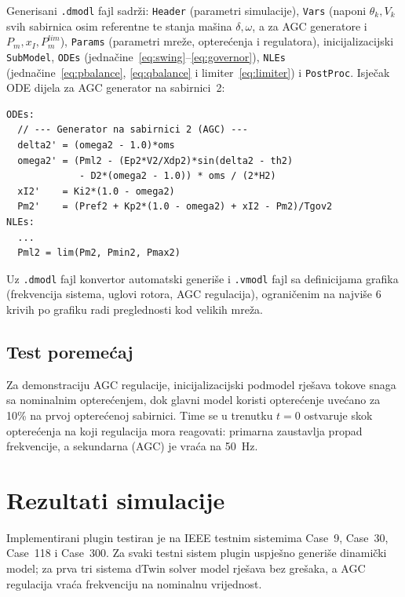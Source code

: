 \documentclass[12pt,oneside, a4paper]{book}
\begin{document}
Generisani \texttt{.dmodl} fajl sadrži: \texttt{Header} (parametri
simulacije), \texttt{Vars} (naponi $\theta_k, V_k$ svih sabirnica osim
referentne te stanja mašina $\delta, \omega$, a za AGC generatore i $P_m,
x_I, P_m^{lim}$), \texttt{Params} (parametri mreže, opterećenja i
regulatora), inicijalizacijski \texttt{SubModel}, \texttt{ODEs}
(jednačine~\ref{eq:swing}--\ref{eq:governor}), \texttt{NLEs}
(jednačine~\ref{eq:pbalance}, \ref{eq:qbalance} i limiter~\ref{eq:limiter})
i \texttt{PostProc}. Isječak ODE dijela za AGC generator na sabirnici~2:
 
\begin{lstlisting}[caption={Isječak generisanog .dmodl fajla -- AGC generator na sabirnici 2}, style=cppstyle]
ODEs:
  // --- Generator na sabirnici 2 (AGC) ---
  delta2' = (omega2 - 1.0)*oms
  omega2' = (Pml2 - (Ep2*V2/Xdp2)*sin(delta2 - th2)
             - D2*(omega2 - 1.0)) * oms / (2*H2)
  xI2'    = Ki2*(1.0 - omega2)
  Pm2'    = (Pref2 + Kp2*(1.0 - omega2) + xI2 - Pm2)/Tgov2
NLEs:
  ...
  Pml2 = lim(Pm2, Pmin2, Pmax2)
\end{lstlisting}
 
Uz \texttt{.dmodl} fajl konvertor automatski generiše i \texttt{.vmodl} fajl
sa definicijama grafika (frekvencija sistema, uglovi rotora, AGC regulacija),
ograničenim na najviše 6 krivih po grafiku radi preglednosti kod velikih
mreža.
 
\subsection{Test poremećaj}
 
Za demonstraciju AGC regulacije, inicijalizacijski podmodel rješava tokove
snaga sa nominalnim opterećenjem, dok glavni model koristi opterećenje
uvećano za 10\% na prvoj opterećenoj sabirnici. Time se u trenutku $t=0$
ostvaruje skok opterećenja na koji regulacija mora reagovati: primarna
zaustavlja propad frekvencije, a sekundarna (AGC) je vraća na 50~Hz.
 
\section{Rezultati simulacije}
 
Implementirani plugin testiran je na IEEE testnim sistemima Case~9, Case~30,
Case~118 i Case~300. Za svaki testni sistem plugin uspješno generiše
dinamički model; za prva tri sistema dTwin solver model rješava bez grešaka,
a AGC regulacija vraća frekvenciju na nominalnu vrijednost.
 
\end{document}
